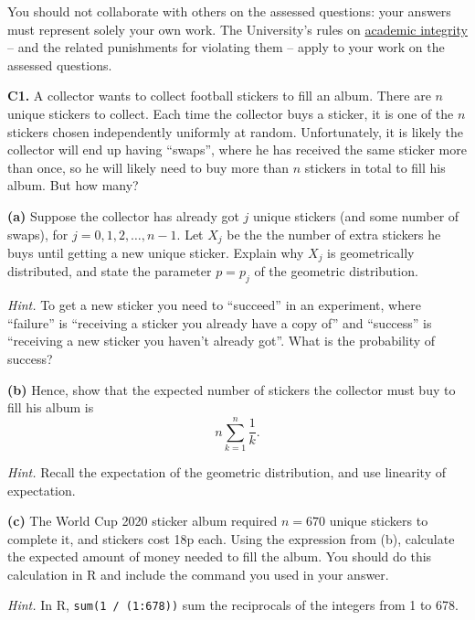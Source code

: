 \documentclass[
  a4paper,
]{book}
\theoremstyle{definition}
\theoremstyle{definition}
\theoremstyle{definition}
\theoremstyle{definition}
\theoremstyle{remark}
\begin{document}
You should not collaborate with others on the assessed questions: your answers must represent solely your own work. The University's rules on \href{https://library.leeds.ac.uk/info/1401/academic_skills/46/academic_integrity_and_plagiarism}{academic integrity} -- and the related punishments for violating them -- apply to your work on the assessed questions.

\textbf{C1.} A collector wants to collect football stickers to fill an album. There are \(n\) unique stickers to collect. Each time the collector buys a sticker, it is one of the \(n\) stickers chosen independently uniformly at random. Unfortunately, it is likely the collector will end up having ``swaps'', where he has received the same sticker more than once, so he will likely need to buy more than \(n\) stickers in total to fill his album. But how many?

\textbf{(a)} Suppose the collector has already got \(j\) unique stickers (and some number of swaps), for \(j = 0, 1, 2, \dots, n-1\). Let \(X_j\) be the the number of extra stickers he buys until getting a new unique sticker. Explain why \(X_j\) is geometrically distributed, and state the parameter \(p = p_j\) of the geometric distribution.

\begin{myanswers}
\emph{Hint.} To get a new sticker you need to ``succeed'' in an experiment, where ``failure'' is ``receiving a sticker you already have a copy of'' and ``success'' is ``receiving a new sticker you haven't already got''. What is the probability of success?

\end{myanswers}

\textbf{(b)} Hence, show that the expected number of stickers the collector must buy to fill his album is
\[ n \sum_{k=1}^n \frac{1}{k} . \]

\begin{myanswers}
\emph{Hint.} Recall the expectation of the geometric distribution, and use linearity of expectation.

\end{myanswers}

\textbf{(c)} The World Cup 2020 sticker album required \(n = 670\) unique stickers to complete it, and stickers cost 18p each. Using the expression from (b), calculate the expected amount of money needed to fill the album. You should do this calculation in R and include the command you used in your answer.

\begin{myanswers}
\emph{Hint.} In R, \texttt{sum(1\ /\ (1:678))} sum the reciprocals of the integers from 1 to 678.

\end{myanswers}
\end{document}
